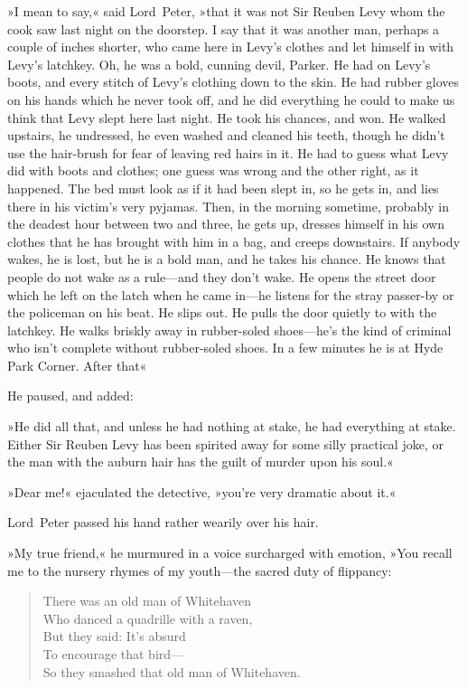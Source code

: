 »I mean to say,« said Lord~Peter, »that it was not Sir Reuben Levy whom the cook saw last night on the doorstep. I say that it was another man, perhaps a couple of inches shorter, who came here in Levy's clothes and let himself in with Levy's latchkey. Oh, he was a bold, cunning devil, Parker. He had on Levy's boots, and every stitch of Levy's clothing down to the skin. He had rubber gloves on his hands which he never took off, and he did everything he could to make us think that Levy slept here last night. He took his chances, and won. He walked upstairs, he undressed, he even washed and cleaned his teeth, though he didn't use the hair-brush for fear of leaving red hairs in it. He had to guess what Levy did with boots and clothes; one guess was wrong and the other right, as it happened. The bed must look as if it had been slept in, so he gets in, and lies there in his victim's very pyjamas. Then, in the morning sometime, probably in the deadest hour between two and three, he gets up, dresses himself in his own clothes that he has brought with him in a bag, and creeps downstairs. If anybody wakes, he is lost, but he is a bold man, and he takes his chance. He knows that people do not wake as a rule—and they don't wake. He opens the street door which he left on the latch when he came in—he listens for the stray passer-by or the policeman on his beat. He slips out. He pulls the door quietly to with the latchkey. He walks briskly away in rubber-soled shoes—he's the kind of criminal who isn't complete without rubber-soled shoes. In a few minutes he is at Hyde Park Corner. After that\longdash«

He paused, and added:

»He did all that, and unless he had nothing at stake, he had everything at stake. Either Sir Reuben Levy has been spirited away for some silly practical joke, or the man with the auburn hair has the guilt of murder upon his soul.«

»Dear me!« ejaculated the detective, »you're very dramatic about it.«

Lord~Peter passed his hand rather wearily over his hair.

»My true friend,« he murmured in a voice surcharged with emotion, »You recall me to the nursery rhymes of my youth—the sacred duty of flippancy:

\begin{a4}
	\enlargethispage{\baselineskip}
\end{a4}

\begin{samepage}
\begin{verse}
There was an old man of Whitehaven\\
Who danced a quadrille with a raven,\\
\vin But they said: It's absurd\\
\vin To encourage that bird---\\
So they smashed that old man of Whitehaven.\\
\end{verse}
\end{samepage}


